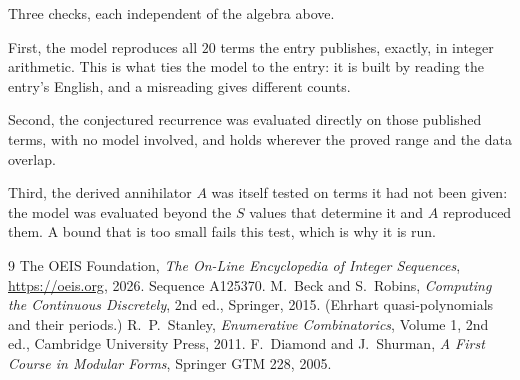 \documentclass[11pt,a4paper]{article}
\theoremstyle{plain}
\theoremstyle{definition}
\begin{document}
Three checks, each independent of the algebra above.

First, the model reproduces all $20$ terms the entry publishes, exactly, in integer
arithmetic. This is what ties the model to the entry: it is built by reading the entry's
English, and a misreading gives different counts.

Second, the conjectured recurrence was evaluated directly on those published terms, with no
model involved, and holds wherever the proved range and the data overlap.

Third, the derived annihilator $A$ was itself tested on terms it had not been given: the model
was evaluated beyond the $S$ values that determine it and $A$ reproduced them. A bound that is
too small fails this test, which is why it is run.

\begin{thebibliography}{9}
 The OEIS Foundation, \emph{The On-Line Encyclopedia of Integer
Sequences}, \url{https://oeis.org}, 2026. Sequence A125370.
 M.~Beck and S.~Robins, \emph{Computing the Continuous Discretely},
2nd ed., Springer, 2015. (Ehrhart quasi-polynomials and their periods.)
 R.~P.~Stanley, \emph{Enumerative Combinatorics}, Volume 1, 2nd ed.,
Cambridge University Press, 2011.
 F.~Diamond and J.~Shurman, \emph{A First Course in Modular Forms},
Springer GTM 228, 2005.
\end{thebibliography}
\end{document}
